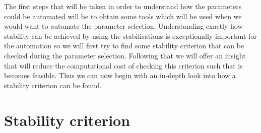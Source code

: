 
The first steps that will be taken in order to understand how the parameters could be automated will be to obtain some tools which will be used when we would want to automate the parameter selection. Understanding exactly how stability can be achieved by using the stabilisations is exceptionally important for the automation so we will first try to find some stability criterion that can be checked during the parameter selection. Following that we will offer an insight that will reduce the computational cost of checking this criterion such that is becomes feasible. Thus we can now begin with an in-depth look into how a stability criterion can be found.

\section{Stability criterion}



